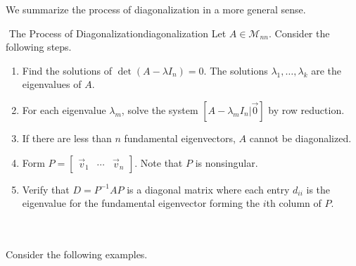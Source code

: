         We summarize the process of diagonalization in a more general sense.
        \begin{theorem}{\Stop\,\,The Process of Diagonalization}{diagonalization}
            Let \(A\in\mathcal{M}_{nn}\). Consider the following steps.
            \begin{enumerate}
                \item Find the solutions of \(\det(A-\lambda I_n)=0\). The solutions \(\lambda_1,\ldots,\lambda_k\) are the eigenvalues of \(A\).
                \item For each eigenvalue \(\lambda_m\), solve the system \([A-\lambda_mI_n|\vec{0}]\) by row reduction.
                \item If there are less than \(n\) fundamental eigenvectors, \(A\) cannot be diagonalized.
                \item Form \(P=\begin{bmatrix} \vec{v}_1 & \cdots & \vec{v}_n \end{bmatrix}\). Note that \(P\) is nonsingular.
                \item Verify that \(D=P^{-1}AP\) is a diagonal matrix where each entry \(d_{ii}\) is the eigenvalue for the fundamental eigenvector forming the \(i\)th column of \(P\).
            \end{enumerate}
        \end{theorem}
        \pagebreak
        \vphantom
        \\
        \\
        Consider the following examples.
